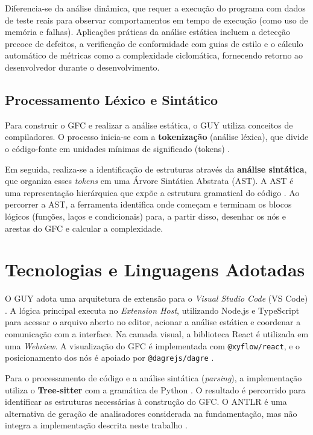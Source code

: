 Diferencia-se da análise dinâmica, que requer a execução do programa com dados de teste reais para observar comportamentos em tempo de execução (como uso de memória e falhas). Aplicações práticas da análise estática incluem a detecção precoce de defeitos, a verificação de conformidade com guias de estilo e o cálculo automático de métricas como a complexidade ciclomática, fornecendo retorno ao desenvolvedor durante o desenvolvimento.

\subsection{Processamento Léxico e Sintático}

Para construir o GFC e realizar a análise estática, o GUY utiliza conceitos de compiladores. O processo inicia-se com a \textbf{tokenização} (análise léxica), que divide o código-fonte em unidades mínimas de significado (tokens) \cite{Cooper2012}.

Em seguida, realiza-se a identificação de estruturas através da \textbf{análise sintática}, que organiza esses \textit{tokens} em uma Árvore Sintática Abstrata (AST). A AST é uma representação hierárquica que expõe a estrutura gramatical do código \cite{Aho1995}. Ao percorrer a AST, a ferramenta identifica onde começam e terminam os blocos lógicos (funções, laços e condicionais) para, a partir disso, desenhar os nós e arestas do GFC e calcular a complexidade.

\section{Tecnologias e Linguagens Adotadas}

O GUY adota uma arquitetura de extensão para o \textit{Visual Studio Code} (VS Code) \cite{microsoft_vscode}. A lógica principal executa no \textit{Extension Host}, utilizando Node.js e TypeScript para acessar o arquivo aberto no editor, acionar a análise estática e coordenar a comunicação com a interface. Na camada visual, a biblioteca React é utilizada em uma \textit{Webview}. A visualização do GFC é implementada com \texttt{@xyflow/react}, e o posicionamento dos nós é apoiado por \texttt{@dagrejs/dagre} \cite{react_docs,xyflowReactWeb,dagreWeb}.

Para o processamento de código e a análise sintática (\textit{parsing}), a implementação utiliza o \textbf{Tree-sitter} com a gramática de Python \cite{TreeSitterWeb}. O resultado é percorrido para identificar as estruturas necessárias à construção do GFC. O ANTLR é uma alternativa de geração de analisadores considerada na fundamentação, mas não integra a implementação descrita neste trabalho \cite{ANTLRWeb}.

